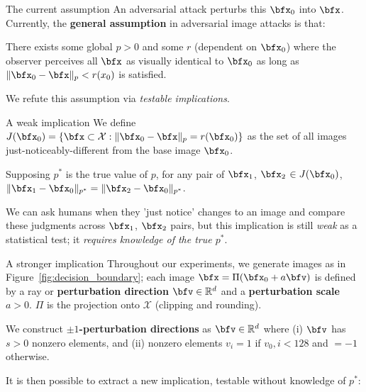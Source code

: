 \documentclass[final,notheorems]{beamer}
\newlength{\colwidth}
\providecommand{\norm}[1]{\lVert#1\rVert}
\def\X{\mathcal X}
\def\R{\mathbb R}
\begin{document}
\begin{frame}[t]
\begin{columns}[t]
\begin{column}{\colwidth}
\begin{alertblock}{The current assumption}
    An adversarial attack perturbs this $\bfx_0$ into $\bfx$. Currently, the \textbf{general assumption} in adversarial image attacks is that:

    \hspace*{.1\linewidth}\colorbox{highlightbg}{\begin{minipage}{.8\linewidth}
      There exists some global $p>0$ and some $r$ (dependent on $\bfx_0$) where the observer perceives all $\bfx$ as visually identical to $\bfx_0$ as long as $\norm{\bfx_0-\bfx}_p < r(x_0)$ is satisfied.
    \end{minipage}}

    We refute this assumption via \emph{testable implications}.
  \end{alertblock}

  \begin{block}{A weak implication}
    We define $J(\bfx_0) = \{\bfx \subset \X : \norm{\bfx_0-\bfx}_p = r(\bfx_0)\}$ as the set of all images just-noticeably-different from the base image $\bfx_0$.

    \hspace*{.1\linewidth}\colorbox{highlightbg}{\begin{minipage}{.8\linewidth}
      Supposing $p^*$ is the true value of $p$, for any pair of $\bfx_1$, $\bfx_2$ $\in J(\bfx_0)$, $\norm{\bfx_1-\bfx_0}_{p^*} = \norm{\bfx_2-\bfx_0}_{p^*}$.
    \end{minipage}}

    We can ask humans when they 'just notice' changes to an image and compare these judgments across $\bfx_1$, $\bfx_2$ pairs, but this implication is still \emph{weak} as a statistical test; it \emph{requires knowledge of the true $p^*$}.
  \end{block}

  \begin{block}{A stronger implication}
    Throughout our experiments, we generate images as in Figure~\ref{fig:decision_boundary};
    each image $\bfx = \Pi(\bfx_0+a\bfv)$ is defined by a ray or \textbf{perturbation direction} $\bfv \in \R^d$ and a \textbf{perturbation scale} $a>0$.
    $\Pi$ is the projection onto $\X$ (clipping and rounding).

    We construct \textbf{$\pm 1$-perturbation directions} as $\bfv\in\R^d$ where
    (i) $\bfv$ has $s>0$ nonzero elements, and
    (ii) nonzero elements $v_i = 1$ if $v_0,i < 128$ and $=-1$ otherwise.

    It is then possible to extract a new implication, testable without knowledge of $p^*$:


\end{block}
\end{column}
\end{columns}
\end{frame}
\end{document}
